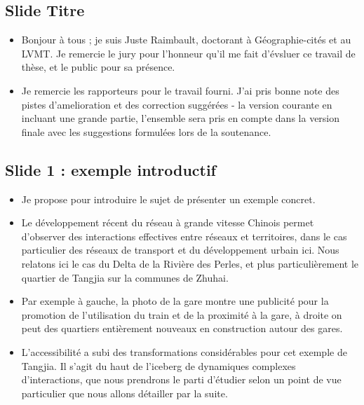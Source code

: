 \documentclass[11pt]{article}
\begin{document}
\subsection*{Slide Titre}

\begin{itemize}
	\item Bonjour à tous ; je suis Juste Raimbault, doctorant à Géographie-cités et au LVMT. Je remercie le jury pour l'honneur qu'il me fait d'évsluer ce travail de thèse, et le public pour sa présence.
	\item Je remercie les rapporteurs pour le travail fourni. J'ai pris bonne note des pistes d'amelioration et des correction suggérées - la version courante en incluant une grande partie, l'ensemble sera pris en compte dans la version finale avec les suggestions formulées lors de la soutenance.
\end{itemize}



\subsection*{Slide 1 : exemple introductif}


\begin{itemize}
	\item Je propose pour introduire le sujet de présenter un exemple concret.
	\item Le développement récent du réseau à grande vitesse Chinois permet d'observer des interactions effectives entre réseaux et territoires, dans le cas particulier des réseaux de transport et du développement urbain ici. Nous relatons ici le cas du Delta de la Rivière des Perles, et plus particulièrement le quartier de Tangjia sur la communes de Zhuhai.
	\item Par exemple à gauche, la photo de la gare montre une publicité pour la promotion de l'utilisation du train et de la proximité à la gare, à droite on peut des quartiers entièrement nouveaux en construction autour des gares.
	\item L'accessibilité a subi des transformations considérables pour cet exemple de Tangjia. Il s'agit du haut de l'iceberg de dynamiques complexes d'interactions, que nous prendrons le parti d'étudier selon un point de vue particulier que nous allons détailler par la suite.
\end{itemize}
\end{document}
